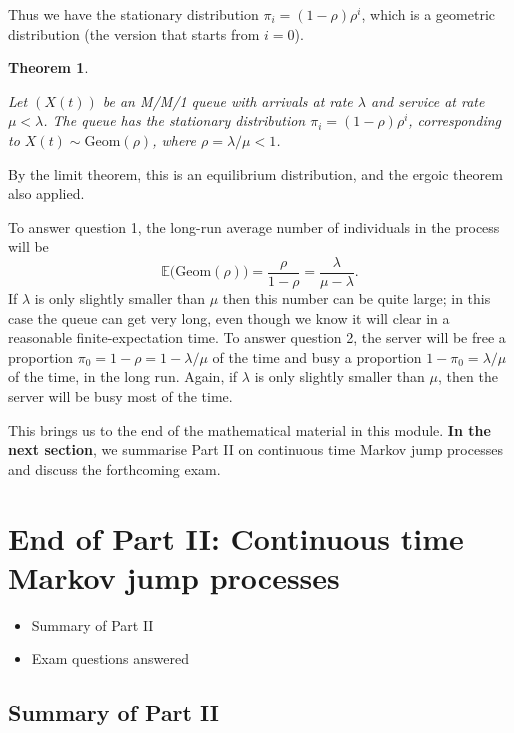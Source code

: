 \documentclass[
  a4paper,
]{article}
\providecommand{\tightlist}{%
  \setlength{\itemsep}{0pt}\setlength{\parskip}{0pt}}
\newtheorem{theorem}{Theorem}[section]
\theoremstyle{definition}
\theoremstyle{definition}
\theoremstyle{definition}
\theoremstyle{remark}
\begin{document}
Thus we have the stationary distribution \(\pi_i = (1 - \rho)\rho^i\),
which is a geometric distribution (the version that starts from \(i = 0\)).

\begin{theorem}
\protect\hypertarget{thm:MMone-thm}{}\label{thm:MMone-thm}

Let \((X(t))\) be an M/M/1 queue with arrivals at rate \(\lambda\) and service at rate \(\mu < \lambda\). The queue has the stationary distribution \(\pi_i = (1 - \rho)\rho^i\), corresponding to \(X(t) \sim \mathrm{Geom}(\rho)\), where \(\rho = \lambda/\mu < 1\).

\end{theorem}

By the limit theorem, this is an equilibrium distribution, and the ergoic theorem also applied.

To answer question 1, the long-run average number of individuals in the process will be
\[ \mathbb E\big(\text{Geom}(\rho)\big) = \frac{\rho}{1-\rho} = \frac{\lambda}{\mu - \lambda} . \]
If \(\lambda\) is only slightly smaller than \(\mu\) then this number can be quite large; in this case the queue can get very long, even though we know it will clear in a reasonable finite-expectation time.
To answer question 2, the server will be free a proportion \(\pi_0 = 1 - \rho = 1 - \lambda/\mu\) of the time and busy a proportion \(1 - \pi_0 = \lambda/\mu\) of the time, in the long run. Again, if \(\lambda\) is only slightly smaller than \(\mu\), then the server will be busy most of the time.

This brings us to the end of the mathematical material in this module. \textbf{In the next section}, we summarise Part II on continuous time Markov jump processes and discuss the forthcoming exam.

\hypertarget{S22-end}{%
\section{End of Part II: Continuous time Markov jump processes}\label{S22-end}}

\begin{itemize}
\tightlist
\item
  Summary of Part II
\item
  Exam questions answered
\end{itemize}

\hypertarget{summary-ii}{%
\subsection{Summary of Part II}\label{summary-ii}}
\end{document}
